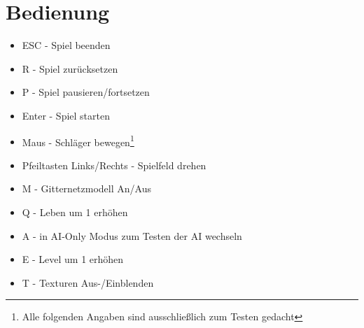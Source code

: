 \section{Bedienung}
\begin{itemize}
	\item ESC - Spiel beenden
	\item R - Spiel zurücksetzen
	\item P - Spiel pausieren/fortsetzen
	\item Enter - Spiel starten
	\item Maus - Schläger bewegen\footnote{Alle folgenden Angaben sind ausschließlich zum Testen gedacht}
	\item Pfeiltasten Links/Rechts - Spielfeld drehen
	\item M - Gitternetzmodell An/Aus
	\item Q - Leben um 1 erhöhen
	\item A - in AI-Only Modus zum Testen der AI wechseln
	\item E - Level um 1 erhöhen
	\item T - Texturen Aus-/Einblenden
\end{itemize}
